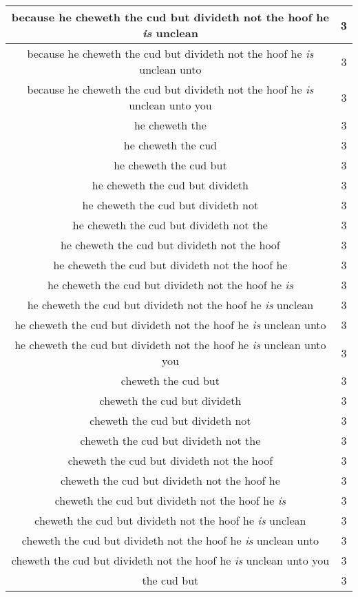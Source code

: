 \begin{center}
\begin{longtable}{|c|c|}
because he cheweth the cud but divideth not the hoof he \emph{is} unclean & 3\\ \hline 
because he cheweth the cud but divideth not the hoof he \emph{is} unclean unto & 3\\ \hline 
because he cheweth the cud but divideth not the hoof he \emph{is} unclean unto you & 3\\ \hline 
he cheweth the & 3\\ \hline 
he cheweth the cud & 3\\ \hline 
he cheweth the cud but & 3\\ \hline 
he cheweth the cud but divideth & 3\\ \hline 
he cheweth the cud but divideth not & 3\\ \hline 
he cheweth the cud but divideth not the & 3\\ \hline 
he cheweth the cud but divideth not the hoof & 3\\ \hline 
he cheweth the cud but divideth not the hoof he & 3\\ \hline 
he cheweth the cud but divideth not the hoof he \emph{is} & 3\\ \hline 
he cheweth the cud but divideth not the hoof he \emph{is} unclean & 3\\ \hline 
he cheweth the cud but divideth not the hoof he \emph{is} unclean unto & 3\\ \hline 
he cheweth the cud but divideth not the hoof he \emph{is} unclean unto you & 3\\ \hline 
cheweth the cud but & 3\\ \hline 
cheweth the cud but divideth & 3\\ \hline 
cheweth the cud but divideth not & 3\\ \hline 
cheweth the cud but divideth not the & 3\\ \hline 
cheweth the cud but divideth not the hoof & 3\\ \hline 
cheweth the cud but divideth not the hoof he & 3\\ \hline 
cheweth the cud but divideth not the hoof he \emph{is} & 3\\ \hline 
cheweth the cud but divideth not the hoof he \emph{is} unclean & 3\\ \hline 
cheweth the cud but divideth not the hoof he \emph{is} unclean unto & 3\\ \hline 
cheweth the cud but divideth not the hoof he \emph{is} unclean unto you & 3\\ \hline 
the cud but & 3\\ \hline 

\end{longtable}
\end{center}
